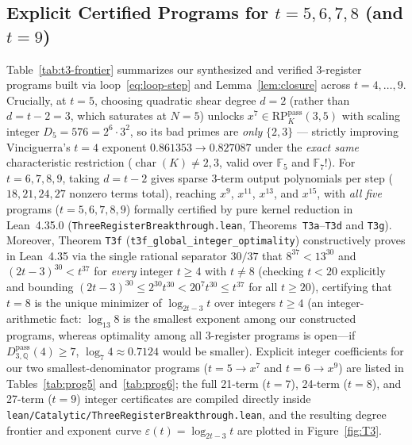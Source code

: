 \documentclass[11pt,reqno]{amsart}
\theoremstyle{definition}
\newcommand{\F}{\mathbb{F}}
\newcommand{\Q}{\mathbb{Q}}
\newcommand{\RP}{\mathrm{RP}}
\newcommand{\pass}{\mathrm{pass}}
\begin{document}
\subsection{Explicit Certified Programs for \texorpdfstring{$t = 5, 6, 7, 8$}{t = 5, 6, 7, 8} (and \texorpdfstring{$t = 9$}{t = 9})}

Table~\ref{tab:t3-frontier} summarizes our synthesized and verified $3$-register programs built via loop~\eqref{eq:loop-step} and Lemma~\ref{lem:closure} across $t = 4, \dots, 9$.
Crucially, at $t = 5$, choosing quadratic shear degree $d = 2$ (rather than $d = t - 2 = 3$, which saturates at $N = 5$) unlocks $x^7 \in \RP_K^{\pass}(3, 5)$ with scaling integer $D_5 = 576 = 2^6 \cdot 3^2$, so its bad primes are \emph{only} $\{2, 3\}$ --- strictly improving Vinciguerra's $t = 4$ exponent $0.861353 \to 0.827087$ under the \emph{exact same} characteristic restriction ($\operatorname{char}(K) \neq 2, 3$, valid over $\F_5$ and $\F_7$!).
For $t = 6, 7, 8, 9$, taking $d = t - 2$ gives sparse $3$-term output polynomials per step ($18, 21, 24, 27$ nonzero terms total), reaching $x^9$, $x^{11}$, $x^{13}$, and $x^{15}$, with \emph{all five} programs ($t = 5, 6, 7, 8, 9$) formally certified by pure kernel reduction in Lean~4.35.0 (\texttt{ThreeRegisterBreakthrough.lean}, Theorems~\texttt{T3a}--\texttt{T3d} and \texttt{T3g}).
Moreover, Theorem \texttt{T3f} (\texttt{t3f\_global\_integer\_optimality}) constructively proves in Lean~4.35 via the single rational separator $30/37$ that $8^{37} < 13^{30}$ and $(2t - 3)^{30} < t^{37}$ for \emph{every} integer $t \ge 4$ with $t \neq 8$ (checking $t < 20$ explicitly and bounding $(2t - 3)^{30} \le 2^{30} t^{30} < 20^7 t^{30} \le t^{37}$ for all $t \ge 20$), certifying that $t = 8$ is the unique minimizer of $\log_{2t - 3} t$ over integers $t \ge 4$ (an integer-arithmetic fact: $\log_{13} 8$ is the smallest exponent among our constructed programs, whereas optimality among all $3$-register programs is open---if $D_{3,\Q}^{\pass}(4) \ge 7$, $\log_7 4 \approx 0.7124$ would be smaller).
Explicit integer coefficients for our two smallest-denominator programs ($t = 5 \to x^7$ and $t = 6 \to x^9$) are listed in Tables~\ref{tab:prog5} and~\ref{tab:prog6}; the full 21-term ($t=7$), 24-term ($t=8$), and 27-term ($t=9$) integer certificates are compiled directly inside \texttt{lean/Catalytic/ThreeRegisterBreakthrough.lean}, and the resulting degree frontier and exponent curve $\varepsilon(t) = \log_{2t-3} t$ are plotted in Figure~\ref{fig:T3}.
\end{document}
